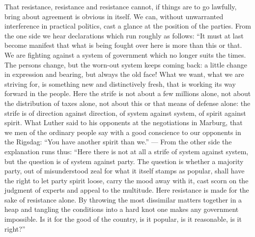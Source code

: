 \documentclass[12pt,a4paper,openany]{book}
\newcommand{\opage}[1]{\marginnote{\footnotesize\textit{[#1]}}}
\begin{document}
That resistance, resistance and resistance cannot, if
things are to go lawfully, bring about
agreement is obvious in itself. We can,
without unwarranted interference in practical politics, cast
a glance at the position of the parties. From the one side we hear
declarations which run roughly as follows: ``It must
at last become manifest that what is being fought over here is more
than this or that. We are fighting against a system of government
which no longer suits the times. The persons
change, but the worn-out system keeps coming back:
a little change in expression and bearing, but always the old
face! What we want, what we are striving for, is something
\setcounter{footnote}{0}%
\opage{16}new and distinctively fresh, that is working its way forward in
the people. Here the strife is not about a few millions alone,
not about the distribution of taxes alone, not about this or
that means of defense alone: the strife is of direction against
direction, of system against system, of spirit against spirit.
What Luther said to his opponents at the negotiations
in Marburg, that we men of the ordinary
people say with a good conscience to our opponents in the
Rigsdag: ``You have another spirit than we.'' --- From the
other side the explanation runs thus: ``Here there is not at all
a strife of system against system, but the question
is of system against party. The question is whether a
majority party, out of misunderstood zeal for what it itself
stamps as popular, shall have the right to let
party spirit loose, carry the mood away with it, cast scorn
on the judgment of experts and appeal to the multitude. Here
resistance is made for the sake of resistance alone. By
throwing the most dissimilar matters together in a heap and tangling the conditions
into a hard knot one makes any
government impossible. Is it for the good of the country, is it
popular, is it reasonable, is it right?''
\end{document}
